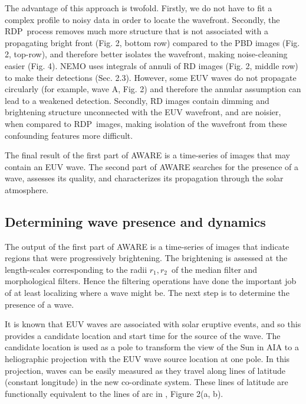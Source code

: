 \documentclass[namedreferences]{solarphysics}
\newcommand{\RDP}{RDP}
\begin{document}
\begin{article}
The advantage of this approach is twofold. Firstly, we do not have to
fit a complex profile to noisy data in order to locate the
wavefront. Secondly, the \RDP\ process removes much more structure
that is not associated with a propagating bright front (Fig. 2, bottom
row) compared to the PBD images (Fig. 2, top-row), and therefore
better isolates the wavefront, making noise-cleaning easier (Fig. 4).
NEMO \citep{2005SoPh..228..265P} uses integrals of annuli of RD images
(Fig. 2, middle row) to make their detections (Sec. 2.3). However,
some EUV waves do not propagate circularly (for example, wave A,
Fig. 2) and therefore the annular assumption can lead to a weakened
detection.  Secondly, RD images contain dimming and brightening
structure unconnected with the EUV wavefront, and are noisier, when
compared to \RDP\ images, making isolation of the wavefront from these
confounding features more difficult.

The final result of the first part of AWARE is a time-series of images
that may contain an EUV wave.  The second part of AWARE searches for
the presence of a wave, assesses its quality, and characterizes its
propagation through the solar atmosphere.

\subsection{Determining wave presence and
  dynamics}\label{sec:aware:dynamics}

The output of the first part of AWARE is a time-series of images that
indicate regions that were progressively brightening.  The brightening
is assessed at the length-scales corresponding to the radii $r_{1},
r_{2}$\textellipsis\ of the median filter and morphological filters.
Hence the filtering operations have done the important job of at least
localizing where a wave might be.  The next step is to determine the
presence of a wave.

It is known that EUV waves are associated with solar eruptive events,
and so this provides a candidate location and start time for the
source of the wave. The candidate location is used as a pole to
transform the view of the Sun in AIA to a heliographic projection with
the EUV wave source location at one pole.  In this projection, waves
can be easily measured as they travel along lines of latitude
(constant longitude) in the new co-ordinate system.  These lines of
latitude are functionally equivalent to the lines of arc in
\citet{2014SoPh..289.3279L}, Figure 2(a, b).


\end{article}
\end{document}
